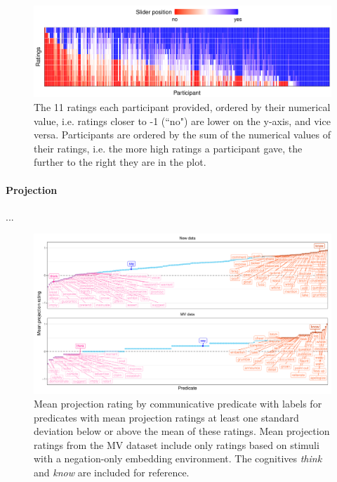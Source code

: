 \documentclass[11pt,fleqn]{article}
\newcommand{\6}{\mbox{$[\hspace*{-.6mm}[$}}
\newcommand{\9}{\mbox{$]\hspace*{-.6mm}]$}}
\begin{document}
\begin{figure}[H]
	\centering
	\includegraphics[width=1\textwidth]{ratings-distribution}
	\caption{The 11 ratings each participant provided, ordered by their numerical value, i.e. ratings closer to -1 (``no") are lower on the y-axis, and vice versa. Participants are ordered by the sum of the numerical values of their ratings, i.e. the more high ratings a participant gave, the further to the right they are in the plot.}
	\label{ratdistr}
\end{figure}



\paragraph{Projection}

...

\begin{figure}[H]
	\centering
	\includegraphics[width=1\textwidth]{projection-by-communicative-comparison-labels-SD}
	\caption{Mean projection rating by communicative predicate with labels for predicates with mean projection ratings at least one standard deviation below or above the mean of these ratings. Mean projection ratings from the MV dataset include only ratings based on stimuli with a negation-only embedding environment. The cognitives \emph{think} and \emph{know} are included for reference.}
	\label{projlabSD}
\end{figure}
\end{document}
